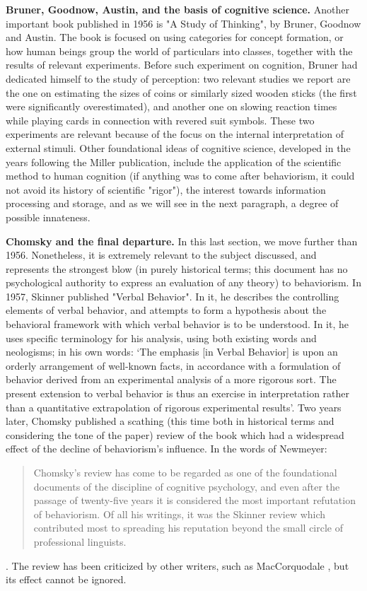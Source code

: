 \documentclass[../main.tex]{subfiles}
\begin{document}
\vspace{4pt}
\textbf{Bruner, Goodnow, Austin, and the basis of cognitive science.} Another important book published in 1956 is "A Study of Thinking", by Bruner, Goodnow and Austin. The book is focused on using categories for concept formation, or how human beings group the world of particulars into classes, together with the results of relevant experiments. Before such experiment on cognition, Bruner had dedicated himself to the study of perception: two relevant studies we report are the one on estimating the sizes of coins or similarly sized wooden sticks (the first were significantly overestimated), and another one on slowing reaction times while playing cards in connection with revered suit symbols. These two experiments are relevant because of the focus on the internal interpretation of external stimuli. Other foundational ideas of cognitive science, developed in the years following the Miller publication, include the application of the scientific method to human cognition (if anything was to come after behaviorism, it could not avoid its history of scientific "rigor"), the interest towards information processing and storage, and as we will see in the next paragraph, a degree of possible innateness.

\vspace{4pt}
\textbf{Chomsky and the final departure.} In this last section, we move further than 1956. Nonetheless, it is extremely relevant to the subject discussed, and represents the strongest blow (in purely historical terms; this document has no psychological authority to express an evaluation of any theory) to behaviorism. In 1957, Skinner published "Verbal Behavior". In it, he describes the controlling elements of verbal behavior, and attempts to form a hypothesis about the behavioral framework with which verbal behavior is to be understood. In it, he uses specific terminology for his analysis, using both existing words and neologisms; in his own words: \enquote*{The emphasis [in Verbal Behavior] is upon an orderly arrangement of well-known facts, in accordance with a formulation of behavior derived from an experimental analysis of a more rigorous sort. The present extension to verbal behavior is thus an exercise in interpretation rather than a quantitative extrapolation of rigorous experimental results}\cite{skinnerVerbalBehavior1957}. Two years later, Chomsky published a scathing (this time both in historical terms and considering the tone of the paper) review \cite{chomskyReviewBFSkinner2013} of the book which had a widespread effect of the decline of behaviorism's influence. In the words of Newmeyer:
\begin{quote}
    Chomsky's review has come to be regarded as one of the foundational documents of the discipline of cognitive psychology, and even after the passage of twenty-five years it is considered the most important refutation of behaviorism. Of all his writings, it was the Skinner review which contributed most to spreading his reputation beyond the small circle of professional linguists.
\end{quote}\cite{newmeyerPoliticsLinguistics1986}. The review has been criticized by other writers, such as MacCorquodale \cite{maccorquodaleChomskyReviewSkinner1970}, but its effect cannot be ignored.
\end{document}
